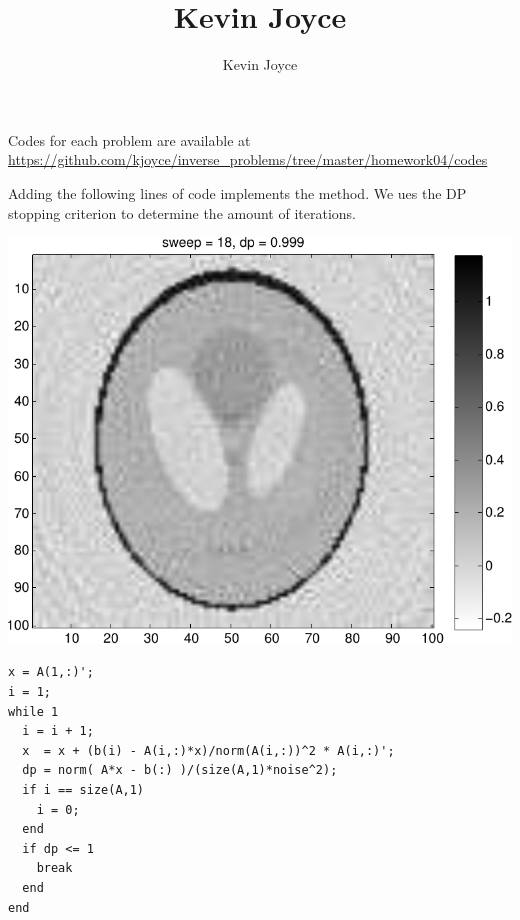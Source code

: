 \documentclass{homework}
\title{Kevin Joyce}
\author{Kevin Joyce}
\begin{document}
 
\newcommand{\figref}[1]{\figurename~\ref{#1}}
\renewcommand{\bar}{\overline}
\renewcommand{\hat}{\widehat}
\renewcommand{\SS}{\mathcal S}
\newcommand{\HH}{\mathscr H}
\newcommand{\mom}{\widetilde}
\newcommand{\mle}{\widehat \Uptheta}
\newcommand{\eps}{\varepsilon}
\newcommand{\todist}{\stackrel{D}\longrightarrow}
\newcommand{\toprob}{\stackrel{p}\longrightarrow}
\newcommand{\TTheta}{\overline{\underline \Theta} }
\newcommand{\del}{\partial}
\newcommand{\approxsim}{\overset{\cdotp}{\underset{\cdotp}{\sim}}}

Codes for each problem are available at \url{https://github.com/kjoyce/inverse_problems/tree/master/homework04/codes}


\begin{solution}
Adding the following lines of code implements the method.  We ues the DP stopping criterion to determine the amount of iterations.

\begin{minipage}{.4\textwidth}
\includegraphics[width=\textwidth]{tomography.pdf}
\end{minipage}
\begin{minipage}{.55\textwidth}
\begin{lstlisting}
x = A(1,:)';
i = 1;
while 1
  i = i + 1;
  x  = x + (b(i) - A(i,:)*x)/norm(A(i,:))^2 * A(i,:)';
  dp = norm( A*x - b(:) )/(size(A,1)*noise^2);
  if i == size(A,1)
    i = 0;
  end
  if dp <= 1
    break
  end
end 
\end{lstlisting}
\end{minipage}

\end{solution}
\end{document}
